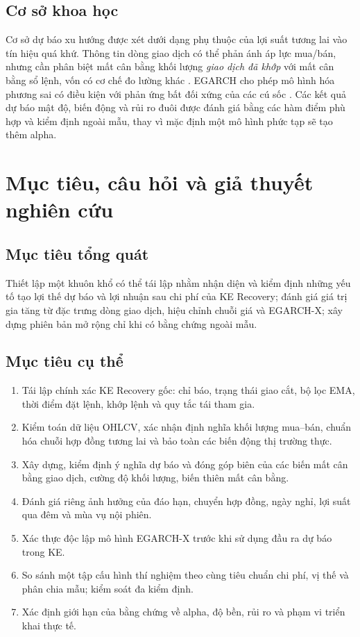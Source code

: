 \documentclass[12pt,a4paper,oneside]{article}
\begin{document}
\subsection{Cơ sở khoa học}
Cơ sở dự báo xu hướng được xét dưới dạng phụ thuộc của lợi suất tương lai vào tín hiệu quá khứ. Thông tin dòng giao dịch có thể phản ánh áp lực mua/bán, nhưng cần phân biệt mất cân bằng khối lượng \emph{giao dịch đã khớp} với mất cân bằng sổ lệnh, vốn có cơ chế đo lường khác \cite{cont2014}. EGARCH cho phép mô hình hóa phương sai có điều kiện với phản ứng bất đối xứng của các cú sốc \cite{nelson1991}. Các kết quả dự báo mật độ, biến động và rủi ro đuôi được đánh giá bằng các hàm điểm phù hợp và kiểm định ngoài mẫu, thay vì mặc định một mô hình phức tạp sẽ tạo thêm alpha.

\section{Mục tiêu, câu hỏi và giả thuyết nghiên cứu}
\subsection{Mục tiêu tổng quát}
Thiết lập một khuôn khổ có thể tái lập nhằm nhận diện và kiểm định những yếu tố tạo lợi thế dự báo và lợi nhuận sau chi phí của KE Recovery; đánh giá giá trị gia tăng từ đặc trưng dòng giao dịch, hiệu chỉnh chuỗi giá và EGARCH-X; xây dựng phiên bản mở rộng chỉ khi có bằng chứng ngoài mẫu.

\subsection{Mục tiêu cụ thể}
\begin{enumerate}
\item Tái lập chính xác KE Recovery gốc: chỉ báo, trạng thái giao cắt, bộ lọc EMA, thời điểm đặt lệnh, khớp lệnh và quy tắc tái tham gia.
\item Kiểm toán dữ liệu OHLCV, xác nhận định nghĩa khối lượng mua--bán, chuẩn hóa chuỗi hợp đồng tương lai và bảo toàn các biến động thị trường thực.
\item Xây dựng, kiểm định ý nghĩa dự báo và đóng góp biên của các biến mất cân bằng giao dịch, cường độ khối lượng, biến thiên mất cân bằng.
\item Đánh giá riêng ảnh hưởng của đáo hạn, chuyển hợp đồng, ngày nghỉ, lợi suất qua đêm và mùa vụ nội phiên.
\item Xác thực độc lập mô hình EGARCH-X trước khi sử dụng đầu ra dự báo trong KE.
\item So sánh một tập cấu hình thí nghiệm theo cùng tiêu chuẩn chi phí, vị thế và phân chia mẫu; kiểm soát đa kiểm định.
\item Xác định giới hạn của bằng chứng về alpha, độ bền, rủi ro và phạm vi triển khai thực tế.
\end{enumerate}
\end{document}
